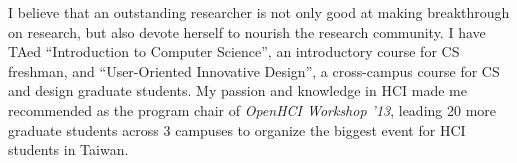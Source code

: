 \noindent
I believe that an outstanding researcher is not only good at making breakthrough on research, 
but also devote herself to nourish the research community.
I have TAed ``Introduction to Computer Science'', an introductory course for CS freshman, 
and ``User-Oriented Innovative Design'', a cross-campus course for CS and design graduate students.
My passion and knowledge in HCI made me recommended as the program chair of \textit{OpenHCI Workshop '13},
leading 20 more graduate students across 3 campuses to organize the biggest event for HCI students in Taiwan. \\



